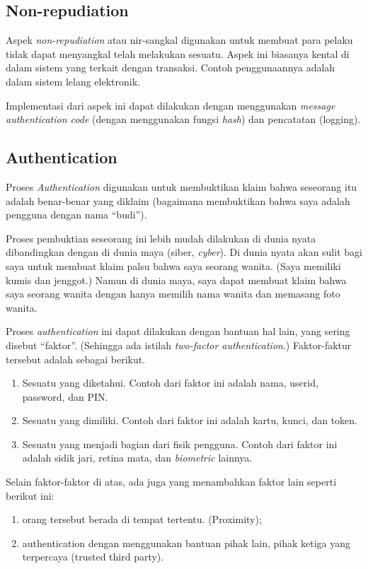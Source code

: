 \subsection{Non-repudiation}
Aspek {\em non-repudiation} atau nir-sangkal digunakan untuk
membuat para pelaku tidak dapat menyangkal telah melakukan sesuatu.
Aspek ini biasanya kental di dalam sistem yang terkait dengan transaksi.
Contoh penggunaannya adalah dalam sistem lelang elektronik.

Implementasi dari aspek ini dapat dilakukan dengan menggunakan
{\em message authentication code} (dengan menggunakan fungsi {\em hash})
dan pencatatan (logging).


\subsection{Authentication}
Proses {\em Authentication} digunakan untuk membuktikan klaim
bahwa seseorang itu adalah benar-benar yang diklaim
(bagaimana membuktikan bahwa saya adalah pengguna dengan nama ``budi'').

Proses pembuktian seseorang ini lebih mudah dilakukan di dunia nyata
dibandingkan dengan di dunia maya (siber, {\em cyber}).
Di dunia nyata akan sulit bagi saya untuk membuat klaim palsu bahwa
saya seorang wanita. (Saya memiliki kumis dan jenggot.)
Namun di dunia maya, saya dapat membuat klaim bahwa saya
seorang wanita dengan hanya memilih nama wanita dan memasang foto
wanita.

Proses {\em authentication} ini dapat dilakukan dengan bantuan
hal lain, yang sering disebut ``faktor''. 
(Sehingga ada istilah {\em two-factor authentication}.)
Faktor-faktur tersebut adalah sebagai berikut.

\begin{enumerate}
\item Sesuatu yang diketahui.
   Contoh dari faktor ini adalah nama, userid, password, dan PIN.
\item Sesuatu yang dimiliki.
   Contoh dari faktor ini adalah kartu, kunci, dan token.
\item Sesuatu yang menjadi bagian dari fisik pengguna.
   Contoh dari faktor ini adalah sidik jari, retina mata,
   dan {\em biometric} lainnya.
\end{enumerate}

Selain faktor-faktor di atas, ada juga yang menambahkan faktor lain
seperti berikut ini:
\begin{enumerate}
\item orang tersebut berada di tempat tertentu. (Proximity);
\item authentication dengan menggunakan bantuan pihak lain,
   pihak ketiga yang terpercaya (trusted third party).
\end{enumerate}


